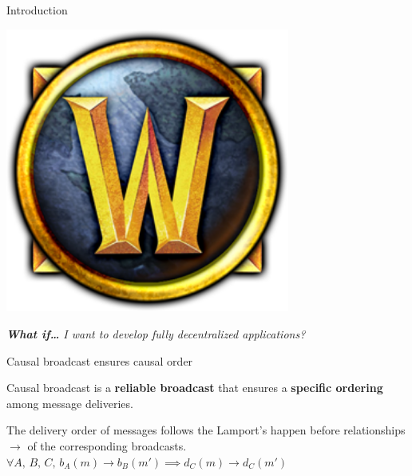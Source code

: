 \documentclass[10pt, xcolor={usenames, dvipsnames}]{beamer}
\begin{document}
\begin{frame}{Introduction}
\begin{minipage}{0.15\textwidth}
    \end{minipage}
    \begin{minipage}{0.15\textwidth}
      \centering
      \includegraphics[width=0.7\textwidth]{logos/wow.png}
    \end{minipage}

    \vspace{3em}  

    \textit{\textbf{What if\ldots} I want to develop fully decentralized
      applications?}
\end{frame}


\begin{frame}{Causal broadcast ensures causal order}

  Causal broadcast is a \textbf{reliable broadcast} that ensures a
  \textbf{specific ordering} among message deliveries.
  
  \vspace{1em}

  \begin{definition}
    The delivery order of messages follows the Lamport's happen before relationships
    $\rightarrow$ of the corresponding broadcasts.
    $\forall A,\,B,\,C,\, b_A(m) \rightarrow b_B(m') \implies d_C(m) \rightarrow
    d_C(m')$
  \end{definition}
  
  \begin{minipage}{0.49\textwidth}
      
  \end{minipage}~~
  \begin{minipage}{0.49\textwidth}
    \begin{center}
      
    \end{center}
  \end{minipage}


\end{frame}
\end{document}
